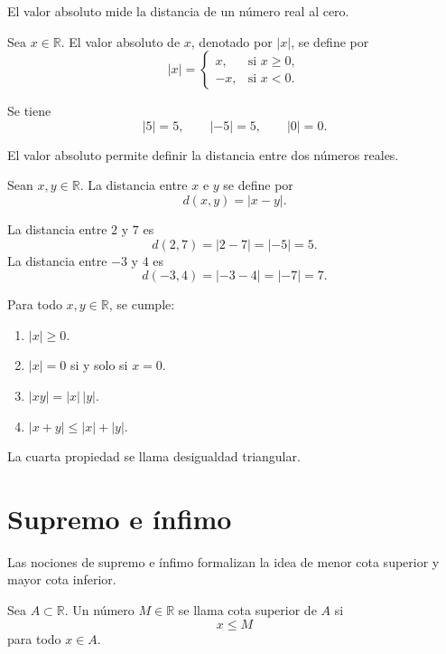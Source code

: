 El valor absoluto mide la distancia de un n\'umero real al cero.

\begin{definicion}
Sea \(x\in\mathbb{R}\). El valor absoluto de \(x\), denotado por \(|x|\), se define por
\[
  |x|=
  \begin{cases}
    x, & \text{si } x\geq 0,\\
    -x, & \text{si } x<0.
  \end{cases}
\]
\end{definicion}

\begin{ejemplo}
Se tiene
\[
  |5|=5,\qquad |-5|=5,\qquad |0|=0.
\]
\end{ejemplo}

El valor absoluto permite definir la distancia entre dos n\'umeros reales.

\begin{definicion}
Sean \(x,y\in\mathbb{R}\). La distancia entre \(x\) e \(y\) se define por
\[
  d(x,y)=|x-y|.
\]
\end{definicion}

\begin{ejemplo}
La distancia entre \(2\) y \(7\) es
\[
  d(2,7)=|2-7|=|-5|=5.
\]
La distancia entre \(-3\) y \(4\) es
\[
  d(-3,4)=|-3-4|=|-7|=7.
\]
\end{ejemplo}

\begin{proposicion}
Para todo \(x,y\in\mathbb{R}\), se cumple:
\begin{enumerate}
  \item \(|x|\geq 0\).
  \item \(|x|=0\) si y solo si \(x=0\).
  \item \(|xy|=|x|\,|y|\).
  \item \(|x+y|\leq |x|+|y|\).
\end{enumerate}
\end{proposicion}

La cuarta propiedad se llama desigualdad triangular.

\section{Supremo e \'infimo}

Las nociones de supremo e \'infimo formalizan la idea de menor cota superior y mayor cota inferior.

\begin{definicion}
Sea \(A\subset\mathbb{R}\). Un n\'umero \(M\in\mathbb{R}\) se llama cota superior de \(A\) si
\[
  x\leq M
\]
para todo \(x\in A\).
\end{definicion}

